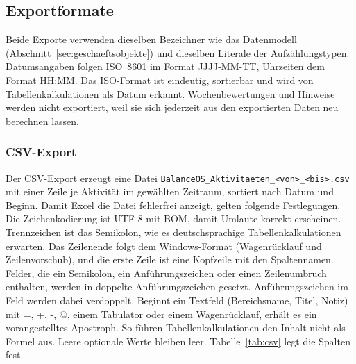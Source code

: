 \subsection{Exportformate}
Beide Exporte verwenden dieselben Bezeichner wie das Datenmodell (Abschnitt~\ref{sec:geschaeftsobjekte}) und dieselben Literale der Aufzählungstypen. Datumsangaben folgen \ac{ISO}~8601 im Format JJJJ-MM-TT, Uhrzeiten dem Format HH:MM. Das ISO-Format ist eindeutig, sortierbar und wird von Tabellenkalkulationen als Datum erkannt. Wochenbewertungen und Hinweise werden nicht exportiert, weil sie sich jederzeit aus den exportierten Daten neu berechnen lassen.

\subsubsection{CSV-Export}\label{sec:csv}
Der CSV-Export erzeugt eine Datei \texttt{BalanceOS\_Aktivitaeten\_<von>\_<bis>.csv} mit einer Zeile je Aktivität im gewählten Zeitraum, sortiert nach Datum und Beginn. Damit Excel die Datei fehlerfrei anzeigt, gelten folgende Festlegungen. Die Zeichenkodierung ist UTF-8 mit BOM, damit Umlaute korrekt erscheinen. Trennzeichen ist das Semikolon, wie es deutschsprachige Tabellenkalkulationen erwarten. Das Zeilenende folgt dem Windows-Format (Wagenrücklauf und Zeilenvorschub), und die erste Zeile ist eine Kopfzeile mit den Spaltennamen. Felder, die ein Semikolon, ein Anführungszeichen oder einen Zeilenumbruch enthalten, werden in doppelte Anführungszeichen gesetzt. Anführungszeichen im Feld werden dabei verdoppelt. Beginnt ein Textfeld (Bereichsname, Titel, Notiz) mit =, +, -, @, einem Tabulator oder einem Wagenrücklauf, erhält es ein vorangestelltes Apostroph. So führen Tabellenkalkulationen den Inhalt nicht als Formel aus. Leere optionale Werte bleiben leer. Tabelle~\ref{tab:csv} legt die Spalten fest.

